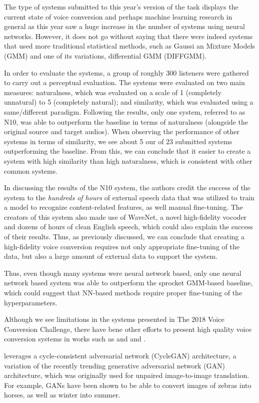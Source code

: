 \documentclass
[
    a4paper,
    twoside,
    12pt
]
{report}
\begin{document}
The type of systems submitted to this year's version of the task
displays the current state of voice conversion and perhaps machine
learning research in general as this year saw a huge increase in the
number of systems using neural networks. However, it does not go without
saying that there were indeed systems that used more traditional
statistical methods, such as Gaussi an Mixture Models (GMM) and one of
its variations, differential GMM (DIFFGMM).

In order to evaluate the systems, a group of roughly 300 listeners were
gathered to carry out a perceptual evaluation. The systems were
evaluated on two main measures: naturalness, which was evaluated on a
scale of 1 (completely unnatural) to 5 (completely natural); and
similarity, which was evaluated using a same/different paradigm.
Following the results, only one system, referred to as N10, was able to
outperform the baseline in terms of naturalness (alongside the original
source and target audios). When observing the performance of other
systems in terms of similarity, we see about 5 our of 23 submitted
systems outperforming the baseline. From this, we can conclude that it
easier to create a system with high similarity than high naturalness,
which is consistent with other common systems.

In discussing the results of the N10 system, the authors credit the
success of the system to the \emph{hundreds of hours} of external speech
data that was utilized to train a model to recognize content-related
features, as well manual fine-tuning. The creators of this system also
made use of WaveNet, a novel high-fidelity vocoder and dozens of hours
of clean English speech, which could also explain the success of their
results. Thus, as previously discussed, we can conclude that creating a
high-fidelity voice conversion requires not only appropriate fine-tuning
of the data, but also a large amount of external data to support the
system.

Thus, even though many systems were neural network based, only one
neural network based system was able to outperform the sprocket
GMM-based baseline, which could suggest that NN-based methods require
proper fine-tuning of the hyperparameters.

Although we see limitations in the systems presented in The 2018 Voice
Conversion Challenge, there have bene other efforts to present high
quality voice conversion systems in works such as and
\textcite{nguyen2016} and \textcite{fang2018}.

\textcite{fang2018} leverages a cycle-consistent adversarial network
(CycleGAN) architecture, a variation of the recently trending generative
adversarial network (GAN) architecture, which was originally used for
unpaired image-to-image translation. For example, GANs have been shown
to be able to convert images of zebras into horses, as well as winter
into summer.
\end{document}
